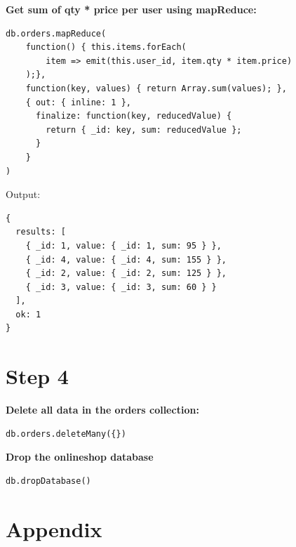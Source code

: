 \documentclass[14pt,a4paper]{extarticle}
\begin{document}
\newpage

	\noindent \textbf{Get sum of qty * price per user using mapReduce:}
\begin{lstlisting}[style=fish]
db.orders.mapReduce(
	function() { this.items.forEach(
		item => emit(this.user_id, item.qty * item.price)
	);},
	function(key, values) { return Array.sum(values); },
	{ out: { inline: 1 },
	  finalize: function(key, reducedValue) {
		return { _id: key, sum: reducedValue };
	  }
	}
)
\end{lstlisting}
\noindent Output:
\begin{lstlisting}[style=fish]
{
  results: [
    { _id: 1, value: { _id: 1, sum: 95 } },
    { _id: 4, value: { _id: 4, sum: 155 } },
    { _id: 2, value: { _id: 2, sum: 125 } },
    { _id: 3, value: { _id: 3, sum: 60 } }
  ],
  ok: 1
}
\end{lstlisting}

	\newpage

	\section*{Step 4}
	\noindent \textbf{Delete all data in the orders collection:}
	\begin{lstlisting}[style=fish]
db.orders.deleteMany({})
	\end{lstlisting}

	\noindent \textbf{Drop the onlineshop database}
	\begin{lstlisting}[style=fish]
db.dropDatabase()
	\end{lstlisting}



	\newpage
	
	\section*{Appendix}

\end{document}
